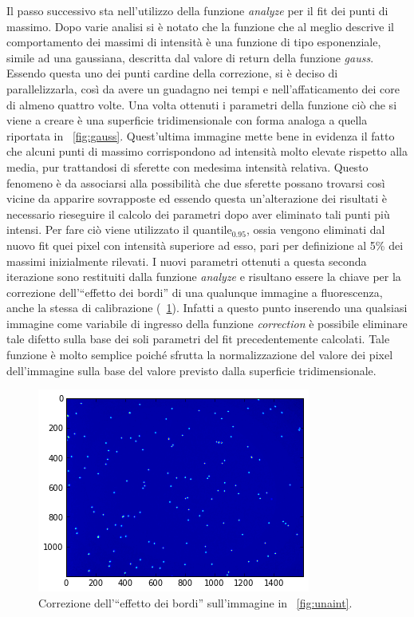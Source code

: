 Il passo successivo sta nell'utilizzo della funzione \textit{analyze} per il fit dei punti di massimo. 
Dopo varie analisi si è notato che la funzione che al meglio descrive il comportamento dei massimi di intensità è una funzione di tipo esponenziale, simile ad una gaussiana, descritta dal valore di return della funzione \textit{gauss}. 
Essendo questa uno dei punti cardine della correzione, si è deciso di parallelizzarla, così da avere un guadagno nei tempi e nell'affaticamento dei core di almeno quattro volte.
Una volta ottenuti i parametri della funzione ciò che si viene a creare è una superficie tridimensionale con forma analoga a quella riportata in \figurename~\ref{fig:gauss}. 
Quest'ultima immagine mette bene in evidenza il fatto che alcuni punti di massimo corrispondono ad intensità molto elevate rispetto alla media, pur trattandosi di sferette con medesima intensità relativa.
Questo fenomeno è da associarsi alla possibilità che due sferette possano trovarsi così vicine da apparire sovrapposte ed essendo questa un'alterazione dei risultati è necessario rieseguire il calcolo dei parametri dopo aver eliminato tali punti più intensi. 
Per fare ciò viene utilizzato il quantile$_{0.95}$, ossia vengono eliminati dal nuovo fit quei pixel con intensità superiore ad esso, pari per definizione al 5\% dei massimi inizialmente rilevati.
I nuovi parametri ottenuti a questa seconda iterazione sono restituiti dalla funzione \textit{analyze} e risultano essere la chiave per la correzione dell'``effetto dei bordi'' di una qualunque immagine a fluorescenza, anche la stessa di calibrazione (\figurename~\ref{fig:unaintcorr}).
Infatti a questo punto inserendo una qualsiasi immagine come variabile di ingresso della funzione \textit{correction} è possibile eliminare tale difetto sulla base dei soli parametri del fit precedentemente calcolati. 
Tale funzione è molto semplice poiché sfrutta la normalizzazione del valore dei pixel dell'immagine sulla base del valore previsto dalla superficie tridimensionale.

\begin{figure}
 \centering
 \includegraphics[scale=1]{img/CAP3unaintcorr.png}
 \caption{\small{Correzione dell'``effetto dei bordi'' sull'immagine in \figurename~\ref{fig:unaint}.}}
 \label{fig:unaintcorr}
\end{figure}

